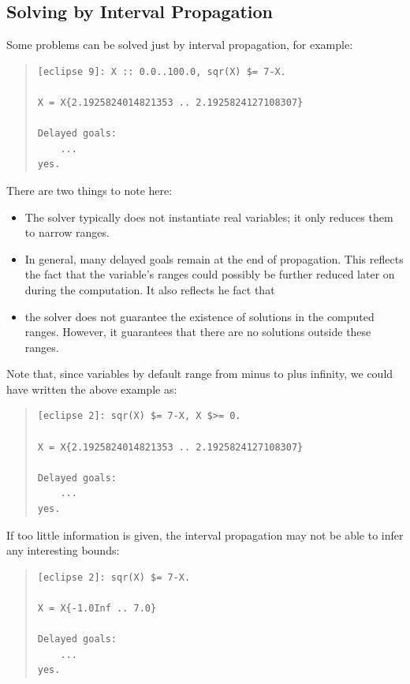 \subsection{Solving by Interval Propagation}
Some problems can be solved just by interval propagation, for example:
\begin{quote}
\begin{verbatim}
[eclipse 9]: X :: 0.0..100.0, sqr(X) $= 7-X.

X = X{2.1925824014821353 .. 2.1925824127108307}

Delayed goals:
    ...
yes.
\end{verbatim}
\end{quote}
There are two things to note here:
\begin{itemize}
\item The solver typically does not instantiate real variables; it only
    reduces them to narrow ranges.
\item In general, many delayed goals remain at the end of propagation.
    This reflects the fact that the variable's ranges could possibly
    be further reduced later on during the computation.
    It also reflects he fact that
\item the solver does not guarantee the existence of solutions in the
    computed ranges. However, it guarantees that there are no solutions
    outside these ranges.
\end{itemize}
Note that, since variables by default range from minus to plus infinity,
we could have written the above example as:
\begin{quote}
\begin{verbatim}
[eclipse 2]: sqr(X) $= 7-X, X $>= 0.

X = X{2.1925824014821353 .. 2.1925824127108307}

Delayed goals:
    ...
yes.
\end{verbatim}
\end{quote}
If too little information is given, the interval propagation may not
be able to infer any interesting bounds:
\begin{quote}
\begin{verbatim}
[eclipse 2]: sqr(X) $= 7-X.

X = X{-1.0Inf .. 7.0}

Delayed goals:
    ...
yes.
\end{verbatim}
\end{quote}



